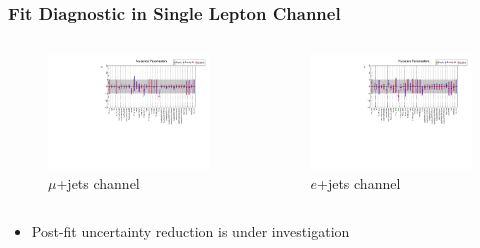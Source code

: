\documentclass{beamer}
\begin{document}
\begin{frame}
\frametitle{Fit Diagnostic in Single Lepton Channel}
\begin{columns}
\begin{figure}
\includegraphics[width=\textwidth]{large_stat/mu/pulls}\caption{$\mu$+jets channel}
\end{figure}
\begin{figure}
\includegraphics[width=\textwidth]{large_stat/el/pulls}\caption{$e$+jets channel}
\end{figure}
\end{columns}
	\begin{itemize}
	\item Post-fit uncertainty reduction is under investigation
	\end{itemize}
\end{frame}
\end{document}
